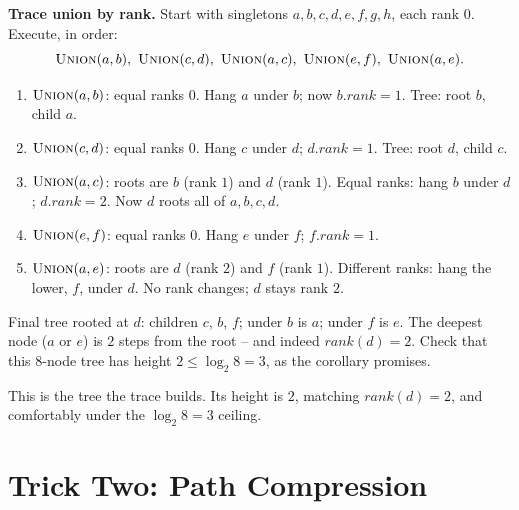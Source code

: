 \begin{labbox}
\textbf{Trace union by rank.} Start with singletons $a,b,c,d,e,f,g,h$, each
rank $0$. Execute, in order:
\[
\textsc{Union}(a,b),\ \textsc{Union}(c,d),\ \textsc{Union}(a,c),\
\textsc{Union}(e,f),\ \textsc{Union}(a,e).
\]
\begin{enumerate}
  \item $\textsc{Union}(a,b)$: equal ranks $0$. Hang $a$ under $b$; now
        $b.\textit{rank}=1$. Tree: root $b$, child $a$.
  \item $\textsc{Union}(c,d)$: equal ranks $0$. Hang $c$ under $d$;
        $d.\textit{rank}=1$. Tree: root $d$, child $c$.
  \item $\textsc{Union}(a,c)$: roots are $b$ (rank $1$) and $d$ (rank $1$).
        Equal ranks: hang $b$ under $d$; $d.\textit{rank}=2$. Now $d$ roots all of
        $a,b,c,d$.
  \item $\textsc{Union}(e,f)$: equal ranks $0$. Hang $e$ under $f$;
        $f.\textit{rank}=1$.
  \item $\textsc{Union}(a,e)$: roots are $d$ (rank $2$) and $f$ (rank $1$).
        Different ranks: hang the lower, $f$, under $d$. No rank changes; $d$ stays
        rank $2$.
\end{enumerate}
Final tree rooted at $d$: children $c$, $b$, $f$; under $b$ is $a$; under $f$ is
$e$. The deepest node ($a$ or $e$) is $2$ steps from the root -- and indeed
$\textit{rank}(d) = 2$. Check that this $8$-node tree has height $2 \le
\log_2 8 = 3$, as the corollary promises.
\end{labbox}

\begin{center}
\end{center}

This is the tree the trace builds. Its height is $2$, matching
$\textit{rank}(d)=2$, and comfortably under the $\log_2 8 = 3$ ceiling.

\section{Trick Two: Path Compression}
\label{ch19:compression}

